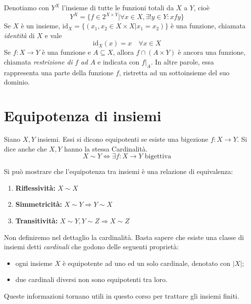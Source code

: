 \documentclass[oneside]{book}
\theoremstyle{remark}
\begin{document}
Denotiamo con $Y^X$ l'insieme di tutte le funzioni totali da $X$ a $Y$, cioè
\[ Y^X = \{f\in2^{X\times Y}| \forall x\in X, \exists!y\in Y: xfy\} \]
Se $X$ è un insieme, $\text{id}_X = \{(x_1,x_2\in X\times X| x_1=x_2)\}$ è
una funzione, chiamata \textit{identità} di $X$ e vale \[ \text{id}_X(x)=x \quad \forall x\in X\]
Se $f:X\to Y$ è una funzione e $A\subseteq X$, allora $f\cap(A\times Y)$
è ancora una funzione, chiamata \textit{restrizione di $f$ ad $A$} e indicata
con $f|_A$. In altre parole, essa rappresenta una parte della funzione $f$,
ristretta ad un sottoinsieme del suo dominio.

\begin{tcolorbox}[colback=yellow!30, colframe=yellow!30!black, title={Composizione}]
\end{tcolorbox}
\begin{tcolorbox}[colback=yellow!30, colframe=yellow!30!black, title={Iniettività, surgettività, bigettività}]
\end{tcolorbox}

\section{Equipotenza di insiemi}
\begin{tcolorbox}[colback=yellow!30, colframe=yellow!30!black, title={Insiemi equipotenti}]
Siano $X,Y$ insiemi. Essi si dicono equipotenti se esiste una bigezione
$f:X\to Y$. Si dice anche che $X,Y$ hanno la stessa Cardinalità.
\[ X\sim Y \Longleftrightarrow \exists f:X\to Y \text{ bigettiva} \]
\end{tcolorbox}

Si può mostrare che l'equipotenza tra insiemi è una relazione di
equivalenza:
\begin{enumerate}
\item \textbf{Riflessività:} $X\sim X$
\item \textbf{Simmetricità:} $X\sim Y \Longrightarrow Y\sim X$
\item \textbf{Transitività:} $X\sim Y, Y\sim Z \Longrightarrow X\sim Z$
\end{enumerate}
Non definiremo nel dettaglio la cardinalità. Basta sapere che esiste
una classe di insiemi detti \textit{cardinali} che godono delle seguenti
proprietà:
\begin{itemize}
\item ogni insieme $X$ è equipotente ad uno ed un solo cardinale,
denotato con $|X|$;
\item due cardinali diversi non sono equipotenti tra loro.
\end{itemize}
Queste informazioni tornano utili in questo corso per trattare gli
insiemi finiti.
\end{document}
